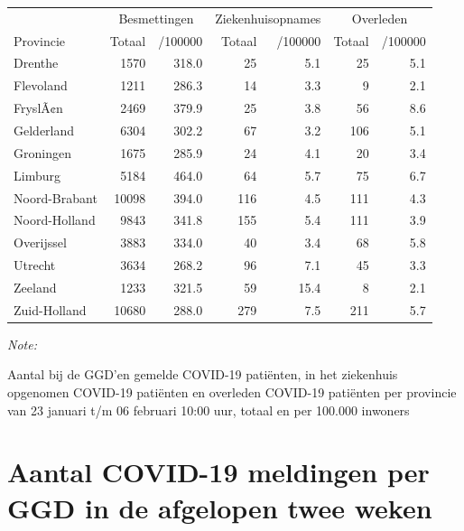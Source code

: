 \documentclass[
  english,
  man,floatsintext]{apa6}
\begin{document}
\begin{table}[H]
\centering
\begin{threeparttable}
\begin{tabular}{lrrrrrr}
\toprule
\multicolumn{1}{c}{ } & \multicolumn{2}{c}{Besmettingen} & \multicolumn{2}{c}{Ziekenhuisopnames} & \multicolumn{2}{c}{Overleden} \\
\cmidrule(l{3pt}r{3pt}){2-3} \cmidrule(l{3pt}r{3pt}){4-5} \cmidrule(l{3pt}r{3pt}){6-7}
Provincie & Totaal & /100000 & Totaal & /100000 & Totaal & /100000\\
\midrule
Drenthe & 1570 & 318.0 & 25 & 5.1 & 25 & 5.1\\
Flevoland & 1211 & 286.3 & 14 & 3.3 & 9 & 2.1\\
FryslÃ¢n & 2469 & 379.9 & 25 & 3.8 & 56 & 8.6\\
Gelderland & 6304 & 302.2 & 67 & 3.2 & 106 & 5.1\\
Groningen & 1675 & 285.9 & 24 & 4.1 & 20 & 3.4\\
Limburg & 5184 & 464.0 & 64 & 5.7 & 75 & 6.7\\
Noord-Brabant & 10098 & 394.0 & 116 & 4.5 & 111 & 4.3\\
Noord-Holland & 9843 & 341.8 & 155 & 5.4 & 111 & 3.9\\
Overijssel & 3883 & 334.0 & 40 & 3.4 & 68 & 5.8\\
Utrecht & 3634 & 268.2 & 96 & 7.1 & 45 & 3.3\\
Zeeland & 1233 & 321.5 & 59 & 15.4 & 8 & 2.1\\
Zuid-Holland & 10680 & 288.0 & 279 & 7.5 & 211 & 5.7\\
\bottomrule
\end{tabular}
\begin{tablenotes}
\item \textit{Note: } 
\item Aantal bij de GGD’en gemelde COVID-19 patiënten, in het ziekenhuis opgenomen COVID-19 patiënten en overleden COVID-19 patiënten per provincie van 23 januari t/m 06 februari 10:00 uur, totaal en per 100.000 inwoners
\end{tablenotes}
\end{threeparttable}
\end{table}

\newpage

\hypertarget{aantal-covid-19-meldingen-per-ggd-in-de-afgelopen-twee-weken}{%
\section{Aantal COVID-19 meldingen per GGD in de afgelopen twee weken}\label{aantal-covid-19-meldingen-per-ggd-in-de-afgelopen-twee-weken}}
\end{document}
